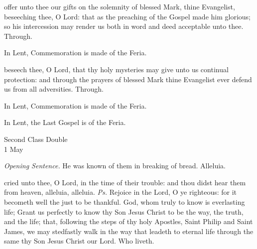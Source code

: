 \secret
{} offer unto thee our gifts on the solemnity of blessed Mark, thine Evangelist, beseeching thee, O Lord: that as the preaching of the Gospel made him glorious; so his intercession may render us both in word and deed acceptable unto thee. Through.
\begin{rubric}
    In Lent, Commemoration is made of the Feria.%
\end{rubric}
\postcommunion
{} beseech thee, O Lord, that thy holy mysteries may give unto us continual protection: and through the prayers of blessed Mark thine Evangelist ever defend us from all adversities. Through.
\begin{rubric}
    In Lent, Commemoration is made of the Feria.%
\end{rubric}
\begin{rubric}
    In Lent, the Last Gospel is of the Feria.%
\end{rubric}


\begin{inhead}
    {Second Class Double\\
1 May}
\end{inhead}
\par\noindent
\textit{Opening Sentence.} He was known of them in breaking of bread. Alleluia.\par
{}


\introit
{} cried unto thee, O Lord, in the time of their trouble: and thou didst hear them from heaven, alleluia, alleluia. \textit{Ps.} Rejoice in the Lord, O ye righteous: for it becometh well the just to be thankful.
\collect
{} God, whom truly to know is everlasting life; Grant us perfectly to know thy Son Jesus Christ to be the way, the truth, and the life; that, following the steps of thy holy Apostles, Saint Philip and Saint James, we may stedfastly walk in the way that leadeth to eternal life through the same thy Son Jesus Christ our Lord. Who liveth.

